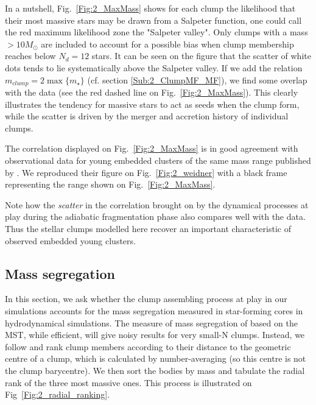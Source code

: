  In a nutshell, Fig.~\ref{Fig:2_MaxMass} shows for each clump the likelihood that their most massive stars may be drawn from a Salpeter function, one could call the red maximum likelihood zone the "Salpeter valley". Only clumps with a mass $> 10 M_\odot$ are included to account for a possible bias when clump membership reaches below $N_d =12 $ stars. It can be seen on the figure that the scatter of white dots tends to lie systematically above the Salpeter valley. If we add the  relation $m_{clump} = 2\max\{m_\star\}$ (cf. section \ref{Sub:2_ClumpMF_MF}), we find some overlap with the data (see the red dashed line on Fig.~\ref{Fig:2_MaxMass}). This clearly illustrates the tendency for massive stars to act as seeds when the clump form, while the scatter is driven by the merger and accretion history of individual clumps. 
 
 The correlation displayed on Fig.~\ref{Fig:2_MaxMass} is in good agreement with observational data for young embedded clusters of the same mass range published by \citealt{Weidner2013}. We reproduced their figure on Fig.~\ref{Fig:2_weidner} with a black frame representing the range shown on Fig.~\ref{Fig:2_MaxMass}. 
 
 Note how the {\it scatter} in the correlation brought on by the dynamical processes at play during the adiabatic fragmentation phase also compares well with the data. Thus the stellar clumps modelled here recover an important characteristic of observed embedded young clusters.
 





\subsection{Mass segregation}
\label{Sec:2_ClumpSegregation}

In this section, we ask whether the clump assembling process at play in our simulations accounts for the mass segregation measured  in  star-forming cores in hydrodynamical simulations. The measure of mass segregation of \cite{Olczak2011} based on the MST, while efficient, will give noisy results for very small-N clumps. Instead, we follow \cite{Maschberger2010} and rank clump members according to their distance to the geometric centre of a clump, which is calculated by number-averaging (so this centre is not the clump barycentre). We then sort the bodies by mass and tabulate the radial rank of the three most massive ones. This process is illustrated on Fig~\ref{Fig:2_radial_ranking}.


